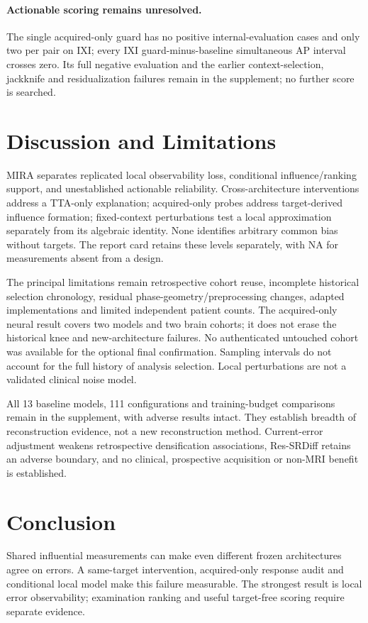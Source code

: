 \documentclass[10pt,twocolumn,letterpaper]{article}
\begin{document}
\paragraph{Actionable scoring remains unresolved.}
The single acquired-only guard has no positive internal-evaluation cases and only two per pair on IXI; every IXI guard-minus-baseline simultaneous AP interval crosses zero. Its full negative evaluation and the earlier context-selection, jackknife and residualization failures remain in the supplement; no further score is searched.

\section{Discussion and Limitations}
MIRA separates replicated local observability loss, conditional influence/ranking support, and unestablished actionable reliability. Cross-architecture interventions address a TTA-only explanation; acquired-only probes address target-derived influence formation; fixed-context perturbations test a local approximation separately from its algebraic identity. None identifies arbitrary common bias without targets. The report card retains these levels separately, with NA for measurements absent from a design.

The principal limitations remain retrospective cohort reuse, incomplete historical selection chronology, residual phase-geometry/preprocessing changes, adapted implementations and limited independent patient counts. The acquired-only neural result covers two models and two brain cohorts; it does not erase the historical knee and new-architecture failures. No authenticated untouched cohort was available for the optional final confirmation. Sampling intervals do not account for the full history of analysis selection. Local perturbations are not a validated clinical noise model.

All 13 baseline models, 111 configurations and training-budget comparisons remain in the supplement, with adverse results intact. They establish breadth of reconstruction evidence, not a new reconstruction method. Current-error adjustment weakens retrospective densification associations, Res-SRDiff retains an adverse boundary, and no clinical, prospective acquisition or non-MRI benefit is established.

\section{Conclusion}
Shared influential measurements can make even different frozen architectures agree on errors. A same-target intervention, acquired-only response audit and conditional local model make this failure measurable. The strongest result is local error observability; examination ranking and useful target-free scoring require separate evidence.

\clearpage
{\small}
\end{document}
